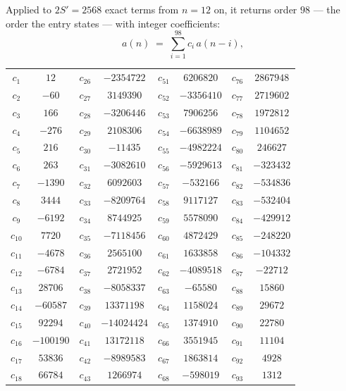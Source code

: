 \documentclass[11pt,a4paper]{article}
\theoremstyle{plain}
\theoremstyle{definition}
\begin{document}
Applied to $2S'=2568$ exact terms from $n=12$ on, it returns order $98$ --- the
order the entry states --- with integer coefficients:
\[
a(n)\;=\;\sum_{i=1}^{98}c_i\,a(n-i),
\]
\begin{center}\small
\begin{tabular}{cccccccc}
$c_{1}$ & $12$ & $c_{26}$ & $-2354722$ & $c_{51}$ & $6206820$ & $c_{76}$ & $2867948$ \\
$c_{2}$ & $-60$ & $c_{27}$ & $3149390$ & $c_{52}$ & $-3356410$ & $c_{77}$ & $2719602$ \\
$c_{3}$ & $166$ & $c_{28}$ & $-3206446$ & $c_{53}$ & $7906256$ & $c_{78}$ & $1972812$ \\
$c_{4}$ & $-276$ & $c_{29}$ & $2108306$ & $c_{54}$ & $-6638989$ & $c_{79}$ & $1104652$ \\
$c_{5}$ & $216$ & $c_{30}$ & $-11435$ & $c_{55}$ & $-4982224$ & $c_{80}$ & $246627$ \\
$c_{6}$ & $263$ & $c_{31}$ & $-3082610$ & $c_{56}$ & $-5929613$ & $c_{81}$ & $-323432$ \\
$c_{7}$ & $-1390$ & $c_{32}$ & $6092603$ & $c_{57}$ & $-532166$ & $c_{82}$ & $-534836$ \\
$c_{8}$ & $3444$ & $c_{33}$ & $-8209764$ & $c_{58}$ & $9117127$ & $c_{83}$ & $-532404$ \\
$c_{9}$ & $-6192$ & $c_{34}$ & $8744925$ & $c_{59}$ & $5578090$ & $c_{84}$ & $-429912$ \\
$c_{10}$ & $7720$ & $c_{35}$ & $-7118456$ & $c_{60}$ & $4872429$ & $c_{85}$ & $-248220$ \\
$c_{11}$ & $-4678$ & $c_{36}$ & $2565100$ & $c_{61}$ & $1633858$ & $c_{86}$ & $-104332$ \\
$c_{12}$ & $-6784$ & $c_{37}$ & $2721952$ & $c_{62}$ & $-4089518$ & $c_{87}$ & $-22712$ \\
$c_{13}$ & $28706$ & $c_{38}$ & $-8058337$ & $c_{63}$ & $-65580$ & $c_{88}$ & $15860$ \\
$c_{14}$ & $-60587$ & $c_{39}$ & $13371198$ & $c_{64}$ & $1158024$ & $c_{89}$ & $29672$ \\
$c_{15}$ & $92294$ & $c_{40}$ & $-14024424$ & $c_{65}$ & $1374910$ & $c_{90}$ & $22780$ \\
$c_{16}$ & $-100190$ & $c_{41}$ & $13172118$ & $c_{66}$ & $3551945$ & $c_{91}$ & $11104$ \\
$c_{17}$ & $53836$ & $c_{42}$ & $-8989583$ & $c_{67}$ & $1863814$ & $c_{92}$ & $4928$ \\
$c_{18}$ & $66784$ & $c_{43}$ & $1266974$ & $c_{68}$ & $-598019$ & $c_{93}$ & $1312$ \\

\end{tabular}
\end{center}
\end{document}
